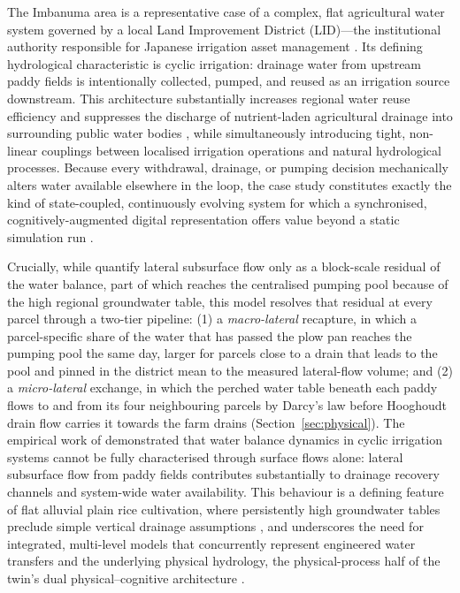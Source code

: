 \documentclass{article}
\begin{document}
The Imbanuma area is a representative case of a complex, flat agricultural water system governed by a local Land Improvement District (LID)---the institutional authority responsible for Japanese irrigation asset management \cite{Kada2005LID, Shiozawa2011}. Its defining hydrological characteristic is cyclic irrigation: drainage water from upstream paddy fields is intentionally collected, pumped, and reused as an irrigation source downstream. This architecture substantially increases regional water reuse efficiency and suppresses the discharge of nutrient-laden agricultural drainage into surrounding public water bodies \cite{Takeda2001Cyclic, Maruyama2008}, while simultaneously introducing tight, non-linear couplings between localised irrigation operations and natural hydrological processes. Because every withdrawal, drainage, or pumping decision mechanically alters water available elsewhere in the loop, the case study constitutes exactly the kind of state-coupled, continuously evolving system for which a synchronised, cognitively-augmented digital representation offers value beyond a static simulation run \cite{Jones2020DigitalTwin, Fuller2020DigitalTwin}.

\begin{changed}
Crucially, while \cite{Okura2025WaterBalance} quantify lateral subsurface flow only as a block-scale residual of the water balance, part of which reaches the centralised pumping pool because of the high regional groundwater table, this model resolves that residual at every parcel through a two-tier pipeline: (1) a \emph{macro-lateral} recapture, in which a parcel-specific share of the water that has passed the plow pan reaches the pumping pool the same day, larger for parcels close to a drain that leads to the pool and pinned in the district mean to the measured lateral-flow volume; and (2) a \emph{micro-lateral} exchange, in which the perched water table beneath each paddy flows to and from its four neighbouring parcels by Darcy's law before Hooghoudt drain flow carries it towards the farm drains (Section~\ref{sec:physical}). The empirical work of \cite{Okura2025WaterBalance} demonstrated that water balance dynamics in cyclic irrigation systems cannot be fully characterised through surface flows alone: lateral subsurface flow from paddy fields contributes substantially to drainage recovery channels and system-wide water availability. This behaviour is a defining feature of flat alluvial plain rice cultivation, where persistently high groundwater tables preclude simple vertical drainage assumptions \cite{Tabuchi1985Paddy, Shiratani2004Subsurface}, and underscores the need for integrated, multi-level models that concurrently represent engineered water transfers and the underlying physical hydrology, the physical-process half of the twin's dual physical--cognitive architecture \cite{Tao2019DigitalTwin}.
\end{changed}
\end{document}
